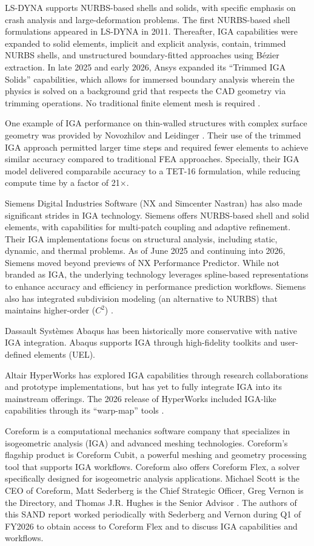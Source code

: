 \documentclass[12pt,report,justified]{SANDreport}
\begin{document}
LS-DYNA supports NURBS-based shells and solids, with specific emphasis on crash analysis and large-deformation problems.  The first NURBS-based shell formulations appeared in LS-DYNA in 2011.  Thereafter, IGA capabilities were expanded to solid elements, implicit and explicit analysis, contain, trimmed NURBS shells, and unstructured boundary-fitted approaches using B\'ezier extraction. In late 2025 and early 2026, Ansys expanded its ``Trimmed IGA Solids'' capabilities, which allows for immersed boundary analysis wherein the physics is solved on a background grid that respects the CAD geometry via trimming operations.  No traditional finite element mesh is required \cite{Novozhilov2025}.

One example of IGA performance on thin-walled structures with complex surface geometry was provided by Novozhilov and Leidinger \cite{Novozhilov2025}.  Their use of the trimmed IGA approach permitted larger time steps and required fewer elements to achieve similar accuracy compared to traditional FEA approaches.  Specially, their IGA model delivered comparabile accuracy to a TET-16 formulation, while reducing compute time by a factor of 21$\times$.

Siemens Digital Industries Software (NX and Simcenter Nastran) has also made significant strides in IGA technology.  Siemens offers NURBS-based shell and solid elements, with capabilities for multi-patch coupling and adaptive refinement.  Their IGA implementations focus on structural analysis, including static, dynamic, and thermal problems.  As of June 2025 and continuing into 2026, Siemens moved beyond previews of NX Performance Predictor.  While not branded as IGA, the underlying technology leverages spline-based representations to enhance accuracy and efficiency in performance prediction workflows.  Siemens also has integrated subdivision modeling (an alternative to NURBS) that maintains higher-order ($C^2$) \cite{SiemensNX2025}.

Dassault Systèmes Abaqus has been historically more conservative with native IGA integration.  Abaqus supports IGA through high-fidelity toolkits and user-defined elements (UEL).

Altair HyperWorks has explored IGA capabilities through research collaborations and prototype implementations, but has yet to fully integrate IGA into its mainstream offerings.  The 2026 release of HyperWorks included IGA-like capabilities through its ``warp-map'' tools \cite{Altair2026}.

Coreform is a computational mechanics software company that specializes in isogeometric analysis (IGA) and advanced meshing technologies.  Coreform's flagship product is Coreform Cubit, a powerful meshing and geometry processing tool that supports IGA workflows.  Coreform also offers Coreform Flex, a solver specifically designed for isogeometric analysis applications.  Michael Scott is the CEO of Coreform, Matt Sederberg is the Chief Strategic Officer, Greg Vernon is the Directory, and Thomas J.R. Hughes is the Senior Advisor \cite{CoreforeAbout2026}.  The authors of this SAND report worked periodically with Sederberg and Vernon during Q1 of FY2026 to obtain access to Coreform Flex and to discuss IGA capabilities and workflows.
\end{document}
